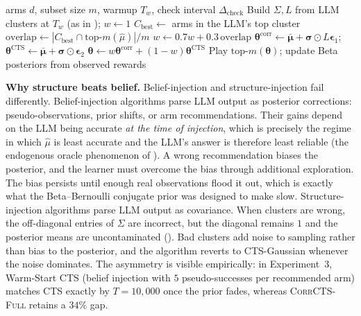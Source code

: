 \documentclass{article}
\theoremstyle{plain}
\theoremstyle{definition}
\theoremstyle{remark}
\newcommand{\CorrFull}{\textsc{CorrCTS-Full}}
\newcommand{\RobustCorr}{\textsc{RobustCorrCTS}}
\begin{document}
\begin{algorithm}[t]
\caption{\RobustCorr{}}
\label{alg:robust}
\begin{algorithmic}[1]
\REQUIRE arms $d$, subset size $m$, warmup $T_w$, check interval $\Delta_{\text{check}}$
\STATE Build $\Sigma, L$ from LLM clusters at $T_w$ (as in ); $w \gets 1$
\STATE $C_{\text{best}} \gets$ arms in the LLM's top cluster
    \STATE $\text{overlap} \gets |C_{\text{best}} \cap \text{top-}m(\hat\mu)| / m$
    \STATE $w \gets 0.7 w + 0.3 \, \text{overlap}$
  \ENDIF
  \STATE $\boldsymbol{\theta}^{\text{corr}} \gets \bar{\boldsymbol\mu} + \boldsymbol\sigma \odot L \boldsymbol{\epsilon}_1$; $\boldsymbol{\theta}^{\text{CTS}} \gets \bar{\boldsymbol\mu} + \boldsymbol\sigma \odot \boldsymbol{\epsilon}_2$
  \STATE $\boldsymbol{\theta} \gets w \boldsymbol{\theta}^{\text{corr}} + (1-w) \boldsymbol{\theta}^{\text{CTS}}$
  \STATE Play $\text{top-}m(\boldsymbol{\theta})$; update Beta posteriors from observed rewards
\ENDFOR
\end{algorithmic}
\end{algorithm}

\textbf{Why structure beats belief.}
Belief-injection and structure-injection fail differently.
Belief-injection algorithms parse LLM output as posterior corrections: pseudo-observations, prior shifts, or arm recommendations.
Their gains depend on the LLM being accurate \emph{at the time of injection}, which is precisely the regime in which $\hat\mu$ is least accurate and the LLM's answer is therefore least reliable (the endogenous oracle phenomenon of ).
A wrong recommendation biases the posterior, and the learner must overcome the bias through additional exploration.
The bias persists until enough real observations flood it out, which is exactly what the Beta--Bernoulli conjugate prior was designed to make slow.
Structure-injection algorithms parse LLM output as covariance.
When clusters are wrong, the off-diagonal entries of $\Sigma$ are incorrect, but the diagonal remains $1$ and the posterior means are uncontaminated ().
Bad clusters add noise to sampling rather than bias to the posterior, and the algorithm reverts to CTS-Gaussian whenever the noise dominates.
The asymmetry is visible empirically: in Experiment~3, Warm-Start CTS (belief injection with $5$ pseudo-successes per recommended arm) matches CTS exactly by $T = 10{,}000$ once the prior fades, whereas \CorrFull{} retains a $34\%$ gap.
\end{document}
